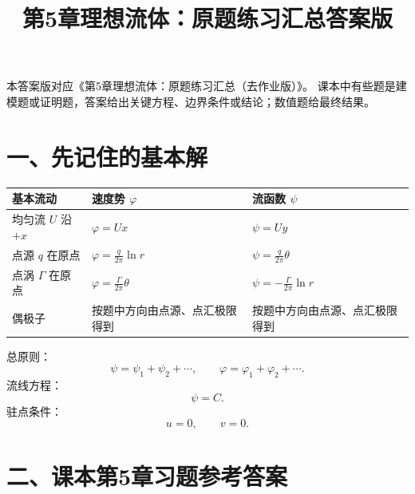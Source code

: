 ﻿\documentclass[UTF8,zihao=-4]{ctexart}
\title{\bfseries 第5章理想流体：原题练习汇总答案版}
\author{}
\date{}
\begin{document}
\maketitle

本答案版对应《第5章理想流体：原题练习汇总（去作业版）》。
课本中有些题是建模题或证明题，答案给出关键方程、边界条件或结论；数值题给最终结果。

\section*{一、先记住的基本解}

\begin{longtable}{p{3cm}p{5.1cm}p{5.8cm}}
\toprule
\textbf{基本流动} & \textbf{速度势 $\varphi$} & \textbf{流函数 $\psi$}\\
\midrule
均匀流 $U$ 沿 $+x$ & $\varphi=Ux$ & $\psi=Uy$\\
点源 $q$ 在原点 & $\displaystyle \varphi=\frac{q}{2\pi}\ln r$ & $\displaystyle \psi=\frac{q}{2\pi}\theta$\\
点涡 $\Gamma$ 在原点 & $\displaystyle \varphi=\frac{\Gamma}{2\pi}\theta$ & $\displaystyle \psi=-\frac{\Gamma}{2\pi}\ln r$\\
偶极子 & 按题中方向由点源、点汇极限得到 & 按题中方向由点源、点汇极限得到\\
\bottomrule
\end{longtable}

总原则：
\[
\psi=\psi_1+\psi_2+\cdots,\qquad
\varphi=\varphi_1+\varphi_2+\cdots .
\]
流线方程：
\[
\psi=C.
\]
驻点条件：
\[
u=0,\qquad v=0.
\]

\section*{二、课本第5章习题参考答案}
\end{document}
